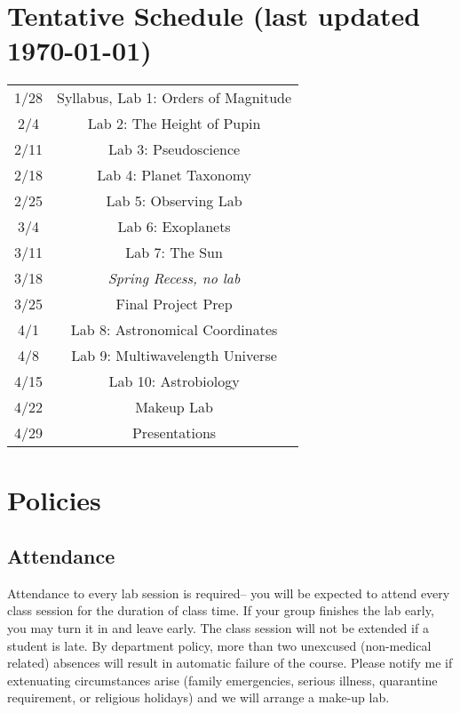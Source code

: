 \documentclass[11pt]{article}
\begin{document}
\section*{Tentative Schedule \small{(last updated \today)}} 

\noindent
\begin{tabular}{cc}
    1/28 & Syllabus, Lab 1: Orders of Magnitude\\ 
    2/4 & Lab 2:  The Height of Pupin\\
    2/11 & Lab 3: Pseudoscience \\
    2/18 & Lab 4: Planet Taxonomy \\
    2/25 & Lab 5: Observing Lab\\
    3/4 & Lab 6: Exoplanets \\
    3/11 &  Lab 7: The Sun\\
    3/18 & \textit{Spring Recess, no lab}\\
    3/25 & Final Project Prep \\
    4/1 & Lab 8: Astronomical Coordinates  \\
    4/8 & Lab 9: Multiwavelength Universe \\
    4/15 & Lab 10: Astrobiology \\
    4/22 & Makeup Lab \\
    4/29 & Presentations  \\
    
\end{tabular}


\section*{Policies}
 
\subsection*{Attendance}
 
Attendance to every lab session is required– you will be expected to attend every class session for the duration of class time. If your group finishes the lab early, you may turn it in and leave early. The class session will not be extended if a student is late. By department policy, more than two unexcused (non-medical related) absences will result in automatic failure of the course. Please notify me if extenuating circumstances arise (family emergencies, serious illness, quarantine requirement, or religious holidays) and we will arrange a make-up lab.
\end{document}
